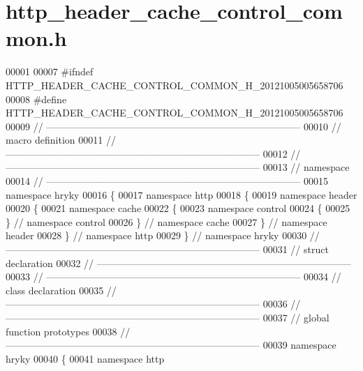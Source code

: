 \hypertarget{http__header__cache__control__common_8h_source}{\section{http\-\_\-header\-\_\-cache\-\_\-control\-\_\-common.\-h}
}

\begin{DoxyCode}
00001 
00007 \textcolor{preprocessor}{#ifndef HTTP\_HEADER\_CACHE\_CONTROL\_COMMON\_H\_20121005005658706}
00008 \textcolor{preprocessor}{}\textcolor{preprocessor}{#define HTTP\_HEADER\_CACHE\_CONTROL\_COMMON\_H\_20121005005658706}
00009 \textcolor{preprocessor}{}\textcolor{comment}{//
      ------------------------------------------------------------------------------}
00010 \textcolor{comment}{// macro definition}
00011 \textcolor{comment}{//
      ------------------------------------------------------------------------------}
00012 \textcolor{comment}{//
      ------------------------------------------------------------------------------}
00013 \textcolor{comment}{// namespace}
00014 \textcolor{comment}{//
      ------------------------------------------------------------------------------}
00015 \textcolor{keyword}{namespace }hryky
00016 \{
00017 \textcolor{keyword}{namespace }http
00018 \{
00019 \textcolor{keyword}{namespace }header
00020 \{
00021 \textcolor{keyword}{namespace }cache
00022 \{
00023 \textcolor{keyword}{namespace }control
00024 \{
00025 \} \textcolor{comment}{// namespace control}
00026 \} \textcolor{comment}{// namespace cache}
00027 \} \textcolor{comment}{// namespace header}
00028 \} \textcolor{comment}{// namespace http}
00029 \} \textcolor{comment}{// namespace hryky}
00030 \textcolor{comment}{//
      ------------------------------------------------------------------------------}
00031 \textcolor{comment}{// struct declaration}
00032 \textcolor{comment}{//
      ------------------------------------------------------------------------------}
00033 \textcolor{comment}{//
      ------------------------------------------------------------------------------}
00034 \textcolor{comment}{// class declaration}
00035 \textcolor{comment}{//
      ------------------------------------------------------------------------------}
00036 \textcolor{comment}{//
      ------------------------------------------------------------------------------}
00037 \textcolor{comment}{// global function prototypes}
00038 \textcolor{comment}{//
      ------------------------------------------------------------------------------}
00039 \textcolor{keyword}{namespace }hryky
00040 \{
00041 \textcolor{keyword}{namespace }http

\end{DoxyCode}
